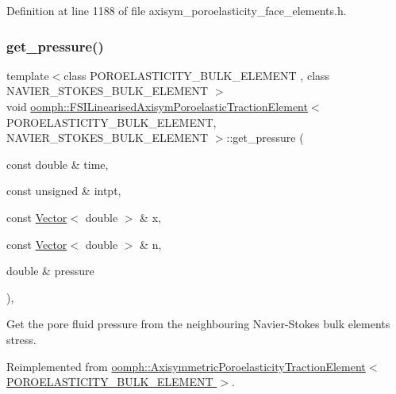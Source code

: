 Definition at line 1188 of file axisym\+\_\+poroelasticity\+\_\+face\+\_\+elements.\+h.

\mbox{\label{classoomph_1_1FSILinearisedAxisymPoroelasticTractionElement_a400115007925a62448e741cad2697472}} 
\subsubsection{\texorpdfstring{get\+\_\+pressure()}{get\_pressure()}}
{\footnotesize\ttfamily template$<$class P\+O\+R\+O\+E\+L\+A\+S\+T\+I\+C\+I\+T\+Y\+\_\+\+B\+U\+L\+K\+\_\+\+E\+L\+E\+M\+E\+NT , class N\+A\+V\+I\+E\+R\+\_\+\+S\+T\+O\+K\+E\+S\+\_\+\+B\+U\+L\+K\+\_\+\+E\+L\+E\+M\+E\+NT $>$ \\
void \hyperlink{classoomph_1_1FSILinearisedAxisymPoroelasticTractionElement}{oomph\+::\+F\+S\+I\+Linearised\+Axisym\+Poroelastic\+Traction\+Element}$<$ P\+O\+R\+O\+E\+L\+A\+S\+T\+I\+C\+I\+T\+Y\+\_\+\+B\+U\+L\+K\+\_\+\+E\+L\+E\+M\+E\+NT, N\+A\+V\+I\+E\+R\+\_\+\+S\+T\+O\+K\+E\+S\+\_\+\+B\+U\+L\+K\+\_\+\+E\+L\+E\+M\+E\+NT $>$\+::get\+\_\+pressure (\begin{DoxyParamCaption}\item[{const double \&}]{time,  }\item[{const unsigned \&}]{intpt,  }\item[{const \hyperlink{classoomph_1_1Vector}{Vector}$<$ double $>$ \&}]{x,  }\item[{const \hyperlink{classoomph_1_1Vector}{Vector}$<$ double $>$ \&}]{n,  }\item[{double \&}]{pressure }\end{DoxyParamCaption})\hspace{0.3cm}{\ttfamily [inline]}, {\ttfamily [virtual]}}



Get the pore fluid pressure from the neighbouring Navier-\/\+Stokes bulk element\textquotesingle{}s stress. 



Reimplemented from \hyperlink{classoomph_1_1AxisymmetricPoroelasticityTractionElement_a1b4adcf0b886054a3d51e0b2910ddbda}{oomph\+::\+Axisymmetric\+Poroelasticity\+Traction\+Element$<$ P\+O\+R\+O\+E\+L\+A\+S\+T\+I\+C\+I\+T\+Y\+\_\+\+B\+U\+L\+K\+\_\+\+E\+L\+E\+M\+E\+N\+T $>$}.



